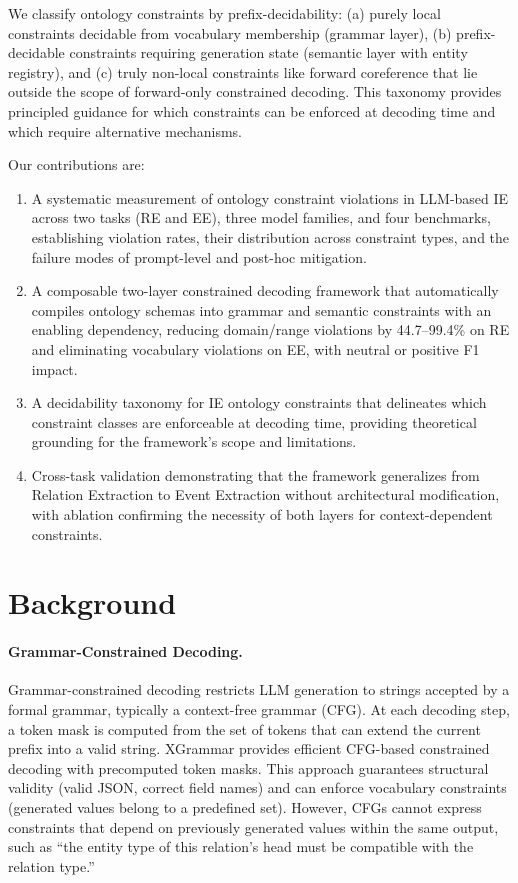 \documentclass[11pt,a4paper]{article}
\begin{document}
We classify ontology constraints by prefix-decidability: (a) purely local constraints decidable from vocabulary membership (grammar layer), (b) prefix-decidable constraints requiring generation state (semantic layer with entity registry), and (c) truly non-local constraints like forward coreference that lie outside the scope of forward-only constrained decoding. This taxonomy provides principled guidance for which constraints can be enforced at decoding time and which require alternative mechanisms.

Our contributions are:
\begin{enumerate}[nosep]
\item A systematic measurement of ontology constraint violations in LLM-based IE across two tasks (RE and EE), three model families, and four benchmarks, establishing violation rates, their distribution across constraint types, and the failure modes of prompt-level and post-hoc mitigation.
\item A composable two-layer constrained decoding framework that automatically compiles ontology schemas into grammar and semantic constraints with an enabling dependency, reducing domain/range violations by 44.7--99.4\% on RE and eliminating vocabulary violations on EE, with neutral or positive F1 impact.
\item A decidability taxonomy for IE ontology constraints that delineates which constraint classes are enforceable at decoding time, providing theoretical grounding for the framework's scope and limitations.
\item Cross-task validation demonstrating that the framework generalizes from Relation Extraction to Event Extraction without architectural modification, with ablation confirming the necessity of both layers for context-dependent constraints.
\end{enumerate}

\section{Background}
\label{sec:background}

\paragraph{Grammar-Constrained Decoding.}
Grammar-constrained decoding restricts LLM generation to strings accepted by a formal grammar, typically a context-free grammar (CFG). At each decoding step, a token mask is computed from the set of tokens that can extend the current prefix into a valid string. XGrammar provides efficient CFG-based constrained decoding with precomputed token masks. This approach guarantees structural validity (valid JSON, correct field names) and can enforce vocabulary constraints (generated values belong to a predefined set). However, CFGs cannot express constraints that depend on previously generated values within the same output, such as ``the entity type of this relation's head must be compatible with the relation type.''
\end{document}
